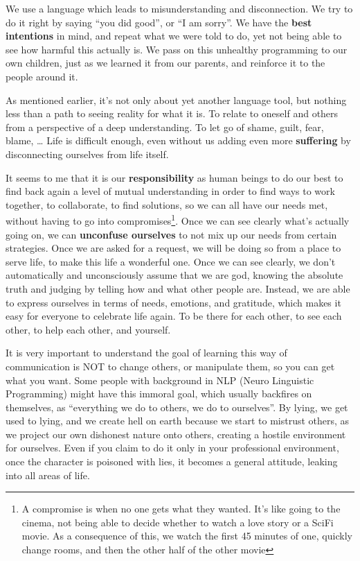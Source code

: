 We use a language which leads to misunderstanding and disconnection.
We try to do it right by saying ``you did good'', or ``I am sorry''.
We have the \textbf{best intentions} in mind, and repeat what we were told to do, yet not being able to see how harmful this actually is.
We pass on this unhealthy programming to our own children, just as we learned it from our parents, and reinforce it to the people around it.

As mentioned earlier, it's not only about yet another language tool, but nothing less than a path to seeing reality for what it is.
To relate to oneself and others from a perspective of a deep understanding.
To let go of shame, guilt, fear, blame, \ldots
Life is difficult enough, even without us adding even more \textbf{suffering} by disconnecting ourselves from life itself.

It seems to me that it is our \textbf{responsibility} as human beings to do our best to find back again a level of mutual understanding in order to find ways to work together, to collaborate, to find solutions, so we can all have our needs met, without having to go into compromises\footnote{A compromise is when no one gets what they wanted. It's like going to the cinema, not being able to decide whether to watch a love story or a SciFi movie. As a consequence of this, we watch the first 45 minutes of one, quickly change rooms, and then the other half of the other movie}.
Once we can see clearly what's actually going on, we can \textbf{unconfuse ourselves} to not mix up our needs from certain strategies.
Once we are asked for a request, we will be doing so from a place to serve life, to make this life a wonderful one.
Once we can see clearly, we don't automatically and unconsciously assume that we are god, knowing the absolute truth and judging by telling how and what other people are.
Instead, we are able to express ourselves in terms of needs, emotions, and gratitude, which makes it easy for everyone to celebrate life again.
To be there for each other, to see each other, to help each other, and yourself.


It is very important to understand the goal of learning this way of communication is NOT to change others, or manipulate them, so you can get what you want.
Some people with background in NLP (Neuro Linguistic Programming) might have this immoral goal, which usually backfires on themselves, as ``everything we do to others, we do to ourselves''.
By lying, we get used to lying, and we create hell on earth because we start to mistrust others, as we project our own dishonest nature onto others, creating a hostile environment for ourselves.
Even if you claim to do it only in your professional environment, once the character is poisoned with lies, it becomes a general attitude, leaking into all areas of life.

